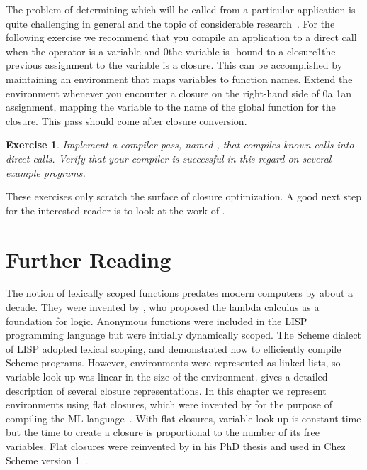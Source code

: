 \documentclass[7x10]{TimesAPriori_MIT}%
\def\racketEd{0}
\def\pythonEd{1}
\providecommand{\BookEdition}{1}
\let\edition\BookEdition
\newcommand{\racket}[1]{{\if\edition\racketEd{#1}\fi}}
\newcommand{\pythonColor}[0]{}
\newcommand{\python}[1]{{\if\edition\pythonEd\pythonColor #1\fi}}
\newtheorem{exercise}[theorem]{Exercise}
\numberwithin{theorem}{chapter}
\numberwithin{definition}{chapter}
\numberwithin{equation}{chapter}
\begin{document}
The problem of determining which  will be called from a
particular application is quite challenging in general and the topic
of considerable research~\citep{Shivers:1988aa,Gilray:2016aa}. For the
following exercise we recommend that you compile an application to a
direct call when the operator is a variable and \racket{the variable
  is -bound to a closure}\python{the previous assignment to
  the variable is a closure}.  This can be accomplished by maintaining
an environment that maps variables to function names.  Extend the
environment whenever you encounter a closure on the right-hand side of
\racket{a }\python{an assignment}, mapping the variable to the
name of the global function for the closure. This pass should come
after closure conversion.

\begin{exercise}\normalfont\normalsize
Implement a compiler pass, named , that
compiles known calls into direct calls. Verify that your compiler is
successful in this regard on several example programs.
\end{exercise}

These exercises only scratch the surface of closure optimization. A
good next step for the interested reader is to look at the work of
\citet{Keep:2012ab}.

\section{Further Reading}

The notion of lexically scoped functions predates modern computers by
about a decade. They were invented by \citet{Church:1932aa}, who
proposed the lambda calculus as a foundation for logic. Anonymous
functions were included in the LISP~\citep{McCarthy:1960dz}
programming language but were initially dynamically scoped. The Scheme
dialect of LISP adopted lexical scoping, and
\citet{Guy-L.-Steele:1978yq} demonstrated how to efficiently compile
Scheme programs. However, environments were represented as linked
lists, so variable look-up was linear in the size of the
environment. \citet{Appel91} gives a detailed description of several
closure representations. In this chapter we represent environments
using flat closures, which were invented by
\citet{Cardelli:1983aa,Cardelli:1984aa} for the purpose of compiling
the ML language~\citep{Gordon:1978aa,Milner:1990fk}.  With flat
closures, variable look-up is constant time but the time to create a
closure is proportional to the number of its free variables.  Flat
closures were reinvented by \citet{Dybvig:1987ab} in his PhD thesis
and used in Chez Scheme version 1~\citep{Dybvig:2006aa}.
\end{document}
